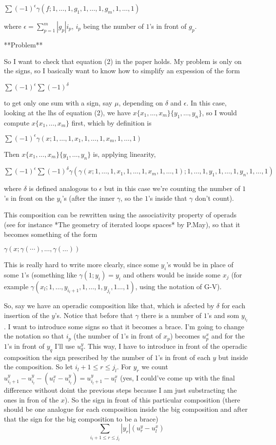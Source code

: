\documentclass[twoside]{article}
\begin{document}
$\sum (-1)^\epsilon \gamma(f;1,\dots,1,g_1,1,\dots, 1, g_m,1,\dots, 1)$

where $\epsilon=\sum_{p=1}^m|g_p|i_p$, $i_p$ being the number of $1$'s in front of $g_p$.

**Problem**

So I want to check that equation (2) in the paper holds. My problem is only on the signs, so I basically want to know how to simplify an expession of the form

$\sum (-1)^\epsilon\sum (-1)^\delta$

to get only one sum with a sign, say $\mu$, depending on $\delta$ and $\epsilon$. In this case, looking at the lhs of equation (2), we have $x\{x_1,\dots, x_m\}\{y_1,\dots, y_n\}$, so I would compute $x\{x_1,\dots, x_m\}$ first, which by definition is

$\sum (-1)^\epsilon \gamma(x;1,\dots,1,x_1,1,\dots, 1, x_m,1,\dots, 1)$

Then $x\{x_1,\dots, x_m\}\{y_1,\dots, y_n\}$ is, applying linearity, 

$\sum (-1)^\epsilon \sum(-1)^\delta\gamma(\gamma(x;1,\dots,1,x_1,1,\dots, 1, x_m,1,\dots, 1); 1,\dots, 1,y_1,1,\dots,1,y_n,1,\dots,1)$

where $\delta$ is defined analogous to $\epsilon$ but in this case we're counting the number of $1$'s in front on the $y_i$'s (after the inner $\gamma$, so the $1$'s inside that $\gamma$ don't count).

This composition can be rewritten using the associativity property of operads (see for instance *The geometry of iterated loops spaces* by P.May), so that it becomes something of the form

$\gamma(x;\gamma(\cdots),\dots, \gamma(\dots))$

This is really hard to write more clearly, since some $y_i$'s would be in place of some $1$'s (something like $\gamma(1;y_i)=y_i$ and others would be inside some $x_j$ (for example $\gamma(x_l;1,\dots, y_{i_l+1}, 1,\dots, 1,y_{j_l},1\dots,1)$, using the notation of G-V).

So, say we have an operadic composition like that, which is afected by $\delta$ for each insertion of the $y$'s. Notice that before that $\gamma$ there is a number of $1$'s and som $y_{i_l}$. I want to introduce some signs so that it becomes a brace. I'm going to change the notation so that $i_p$ (the number of $1$'s in front of $x_p$) becomes $u^x_p$ and for the $1$'s in front of $y_q$ I'll use $u^y_q$. This way, I have to introduce in front of the operadic composition the sign prescribed by the number of $1$'s in front of each $y$ but inside the composition. So let $i_l+1\leq r\leq j_l$. For $y_r$ we count $u^y_{i_l+1}-u^y_{i_l}-(u^x_l-u^y_{i_l})=u^y_{i_l+1}-u^x_l$ (yes, I could've come up with the final difference without doint the previous steps because I am just substracting the ones in fron of the $x$). So the sign in front of this particular composition (there should be one analogue for each composition inside the big composition and after that the sign for the big composition to be a brace)
$$\sum_{i_l+1\leq r\leq j_l}|y_r|(u^y_r-u^x_l)$$
\end{document}
